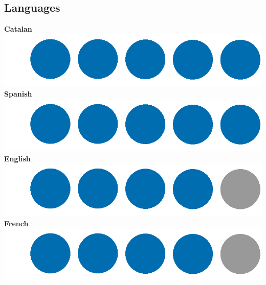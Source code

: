 \documentclass[]{friggeri-cv}
\begin{document}
\begin{aside}
  \section{Languages}
    \textbf{Catalan}\includegraphics[scale=0.17]{img/5starNew.png}
    \textbf{Spanish}\includegraphics[scale=0.17]{img/5starNew.png}
    \textbf{English}\includegraphics[scale=0.17]{img/4starNew.png}
    \textbf{French}\includegraphics[scale=0.17]{img/4starNew.png}
\end{aside}
\end{document}
